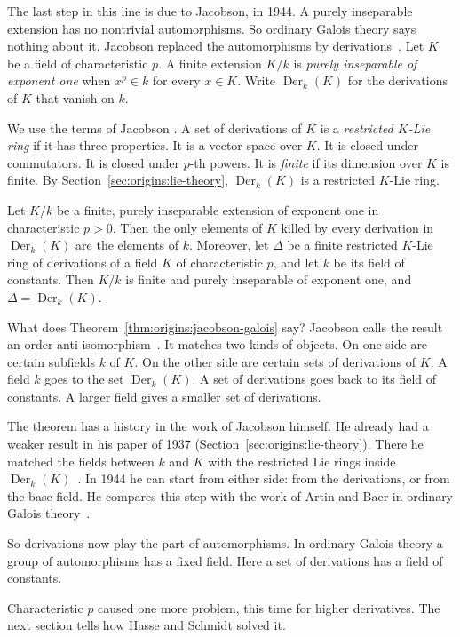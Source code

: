 The last step in this line is due to Jacobson, in 1944. A purely inseparable extension has no nontrivial automorphisms. So ordinary
Galois theory says nothing about it. Jacobson replaced the automorphisms by
derivations~\cite{Jacobson1944}. Let $K$ be a field of characteristic $p$.
A finite extension $K/k$ is \emph{purely inseparable of exponent one} when
$x^p \in k$ for every $x \in K$. Write $\operatorname{Der}_k(K)$ for the
derivations of $K$ that vanish on $k$.

We use the terms of Jacobson \cite[Theorem~1, p.~207]{Jacobson1937}. A set of derivations of $K$ is a
\emph{restricted $K$-Lie ring} if it has three properties. It is a vector
space over $K$. It is closed under commutators. It is closed under $p$-th
powers. It is \emph{finite} if its dimension over $K$ is finite. By
Section~\ref{sec:origins:lie-theory}, $\operatorname{Der}_k(K)$ is a
restricted $K$-Lie ring.

\begin{theorem}\label{thm:origins:jacobson-galois}
Let $K/k$ be a finite, purely inseparable extension of exponent one in
characteristic $p > 0$. Then the only elements of $K$ killed by every
derivation in $\operatorname{Der}_k(K)$ are the elements of $k$. Moreover,
let $\Delta$ be a finite restricted $K$-Lie ring of derivations of a field
$K$ of characteristic $p$, and let $k$ be its field of constants. Then $K/k$
is finite and purely inseparable of exponent one, and
$\Delta = \operatorname{Der}_k(K)$.
\end{theorem}

What does Theorem~\ref{thm:origins:jacobson-galois} say? Jacobson calls the result an order anti-isomorphism~\cite[p.~645]{Jacobson1944}.
It matches two kinds of objects. On one side are certain subfields $k$ of
$K$. On the other side are certain sets of derivations of $K$. A field $k$
goes to the set $\operatorname{Der}_k(K)$. A set of derivations goes back to
its field of constants. A larger field gives a smaller set of derivations.

The theorem has a history in the work of Jacobson himself. He already had a weaker result in his paper of 1937
(Section~\ref{sec:origins:lie-theory}). There he matched the fields between
$k$ and $K$ with the restricted Lie rings inside
$\operatorname{Der}_k(K)$~\cite[p.~220]{Jacobson1937}. In 1944 he can start
from either side: from the derivations, or from the base field. He compares
this step with the work of Artin and Baer in ordinary Galois
theory~\cite[p.~645]{Jacobson1944}.

So derivations now play the part of automorphisms. In ordinary Galois theory
a group of automorphisms has a fixed field. Here a set of derivations has a
field of constants.

Characteristic $p$ caused one more problem, this time for higher derivatives.
The next section tells how Hasse and Schmidt solved it.

